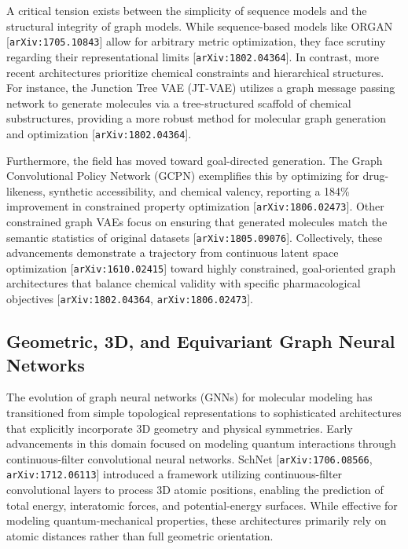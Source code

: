 \documentclass[11pt]{article}
\begin{document}
A critical tension exists between the simplicity of sequence models and the structural integrity of graph models. While sequence-based models like ORGAN [\texttt{arXiv:1705.10843}] allow for arbitrary metric optimization, they face scrutiny regarding their representational limits [\texttt{arXiv:1802.04364}]. In contrast, more recent architectures prioritize chemical constraints and hierarchical structures. For instance, the Junction Tree VAE (JT-VAE) utilizes a graph message passing network to generate molecules via a tree-structured scaffold of chemical substructures, providing a more robust method for molecular graph generation and optimization [\texttt{arXiv:1802.04364}].

Furthermore, the field has moved toward goal-directed generation. The Graph Convolutional Policy Network (GCPN) exemplifies this by optimizing for drug-likeness, synthetic accessibility, and chemical valency, reporting a 184\% improvement in constrained property optimization [\texttt{arXiv:1806.02473}]. Other constrained graph VAEs focus on ensuring that generated molecules match the semantic statistics of original datasets [\texttt{arXiv:1805.09076}]. Collectively, these advancements demonstrate a trajectory from continuous latent space optimization [\texttt{arXiv:1610.02415}] toward highly constrained, goal-oriented graph architectures that balance chemical validity with specific pharmacological objectives [\texttt{arXiv:1802.04364}, \texttt{arXiv:1806.02473}].

\subsection{Geometric, 3D, and Equivariant Graph Neural Networks}

The evolution of graph neural networks (GNNs) for molecular modeling has transitioned from simple topological representations to sophisticated architectures that explicitly incorporate 3D geometry and physical symmetries. Early advancements in this domain focused on modeling quantum interactions through continuous-filter convolutional neural networks. SchNet [\texttt{arXiv:1706.08566}, \texttt{arXiv:1712.06113}] introduced a framework utilizing continuous-filter convolutional layers to process 3D atomic positions, enabling the prediction of total energy, interatomic forces, and potential-energy surfaces. While effective for modeling quantum-mechanical properties, these architectures primarily rely on atomic distances rather than full geometric orientation.
\end{document}
